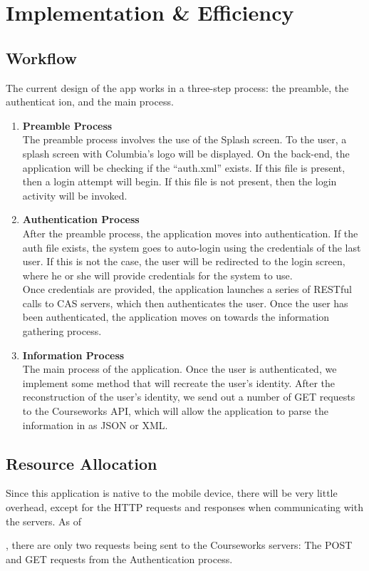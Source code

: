 \documentclass{article}
\begin{document}
\section{Implementation \& Efficiency}

\subsection{Workflow}
The current design of the app works in a three-step process: the preamble, the authenticat
ion, and the main process.
\begin{enumerate}
    \item \textbf{Preamble Process} \\ 
        The preamble process involves the use of the Splash screen. To the user, a splash 
        screen with Columbia's logo will be displayed. On the back-end, the application 
        will be checking if the ``auth.xml'' exists. If this file is present, then a login
        attempt will begin. If this file is not present, then the login activity will be 
        invoked.
    \item \textbf{Authentication Process} \\ 
        After the preamble process, the application moves into authentication. If the auth
        file exists, the system goes to auto-login using the credentials of the last user.
        If this is not the case, the user will be redirected to the login screen, where he
        or she will provide credentials for the system to use. \\ Once credentials are 
        provided, the application launches a series of RESTful calls to CAS servers, which
        then authenticates the user. Once the user has been authenticated, the application
        moves on towards the information gathering process.
        
    \item \textbf{Information Process} \\
        The main process of the application. Once the user is authenticated, we implement
        some method that will recreate the user's identity. After the reconstruction of
        the user's identity, we send out a number of GET requests to the Courseworks API,
        which will allow the application to parse the information in as JSON or XML.
\end{enumerate}

\subsection{Resource Allocation}
Since this application is native to the mobile device, there will be very little 
overhead, except for the HTTP requests and responses when communicating with the 
servers. As of \date{\today}, there are only two requests being sent to the Courseworks 
servers: The POST and GET requests from the Authentication process.
\end{document}
